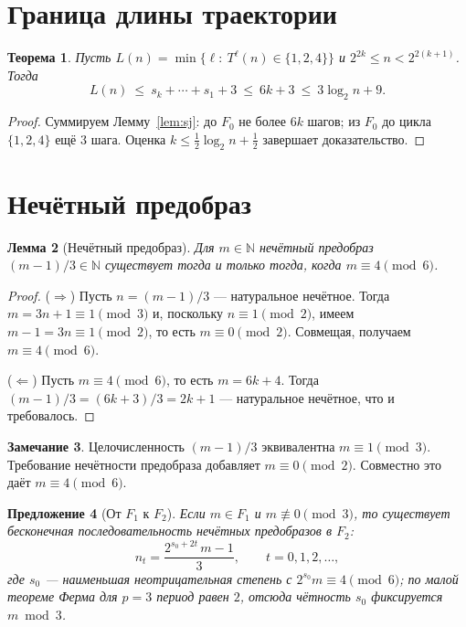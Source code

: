 \documentclass[a4paper,12pt]{article}
\theoremstyle{plain}
\newtheorem{theorem}{Теорема}[section]
\newtheorem{lemma}[theorem]{Лемма}
\newtheorem{proposition}[theorem]{Предложение}
\theoremstyle{definition}
\newtheorem{remark}[theorem]{Замечание}
\begin{document}
\section{Граница длины траектории}\label{sec:length}
\begin{theorem}\label{thm:length}
Пусть $L(n)=\min\{\ell:\ T^\ell(n)\in\{1,2,4\}\}$ и $2^{2k}\le n<2^{2(k+1)}$. Тогда
\begin{equation}\label{eq:length}
L(n)\ \le\ s_k+\cdots+s_1+3\ \le\ 6k+3\ \le\ 3\log_2 n +9.
\end{equation}
\end{theorem}
\begin{proof}
Суммируем Лемму~\ref{lem:sj}: до $F_0$ не более $6k$ шагов; из $F_0$ до цикла $\{1,2,4\}$ ещё 3 шага. Оценка $k\le \tfrac12\log_2 n + \tfrac12$ завершает доказательство.
\end{proof}

\section{Нечётный предобраз}\label{sec:length}
\begin{lemma}[Нечётный предобраз]\label{lem:oddpre}
Для $m\in\mathbb N$ нечётный предобраз $(m-1)/3\in\mathbb N$ существует тогда и только тогда, когда $m\equiv4\pmod6$.
\end{lemma}
\begin{proof}
(\(\Rightarrow\)) Пусть $n=(m-1)/3$ — натуральное нечётное. Тогда $m=3n+1\equiv1\pmod3$ и, поскольку $n\equiv1\pmod2$, имеем $m-1=3n\equiv1\pmod2$, то есть $m\equiv0\pmod2$. Совмещая, получаем $m\equiv4\pmod6$.

(\(\Leftarrow\)) Пусть $m\equiv4\pmod6$, то есть $m=6k+4$. Тогда $(m-1)/3=(6k+3)/3=2k+1$ — натуральное нечётное, что и требовалось.
\end{proof}

\begin{remark}
Целочисленность $(m-1)/3$ эквивалентна $m\equiv1\pmod3$. Требование нечётности предобраза добавляет $m\equiv0\pmod2$. Совместно это даёт $m\equiv4\pmod6$.
\end{remark}

\begin{proposition}[От $F_1$ к $F_2$]\label{prop:F1toF2}
Если $m\in F_1$ и $m\not\equiv0\pmod3$, то существует бесконечная последовательность нечётных предобразов в $F_2$:
\begin{equation}\label{eq:F1F2}
n_t=\frac{2^{s_0+2t}\,m-1}{3},\qquad t=0,1,2,\dots,
\end{equation}
где $s_0$ — наименьшая неотрицательная степень с $2^{s_0}m\equiv4\pmod6$; по малой теореме Ферма для $p=3$ период равен $2$, отсюда чётность $s_0$ фиксируется $m\bmod3$.
\end{proposition}
\end{document}
